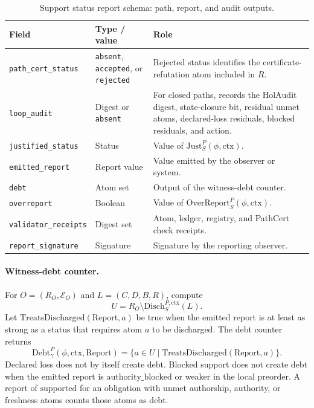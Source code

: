 \documentclass[11pt,twoside]{article}
\newcommand{\OGSchemaTableFont}{\footnotesize}
\newcommand{\OGTableHeaderRow}{\rowcolor{tableheaderbg}}
\newcommand{\TableHeaderRow}{\OGTableHeaderRow}
\newenvironment{OGTable}[2][ht]{%
  \begin{table}[#1]
  \centering
  #2
  \renewcommand{\arraystretch}{1.08}%
  \rowcolors{2}{tablerowbg}{white}%
}{%
  \rowcolors{2}{}{}%
  \end{table}%
}
\theoremstyle{definition}
\newcommand{\Debt}{\mathrm{Debt}}
\newcommand{\Disch}{\mathrm{Disch}}
\newcommand{\Just}{\mathrm{Just}}
\newcommand{\Report}{\mathrm{Report}}
\newcommand{\OverReport}{\mathrm{OverReport}}
\newcommand{\ctx}{\mathrm{ctx}}
\newcommand{\supported}{\mathrm{supported}}
\newcommand{\authorityblocked}{\mathrm{authority\_blocked}}
\begin{document}
\begin{OGTable}{\OGSchemaTableFont}
\begin{tabularx}{\textwidth}{>{\raggedright\arraybackslash}p{}>{\raggedright\arraybackslash}p{}>{\raggedright\arraybackslash}X}
\toprule
\TableHeaderRow \textbf{Field} & \textbf{Type / value} & \textbf{Role} \\
\midrule
\texttt{path\_cert\_status} & \texttt{absent}, \texttt{accepted}, or \texttt{rejected} & Rejected status identifies the certificate-refutation atom included in $R$. \\
\texttt{loop\_audit} & Digest or \texttt{absent} & For closed paths, records the $\mathrm{HolAudit}$ digest, state-closure bit, residual unmet atoms, declared-loss residuals, blocked residuals, and action. \\
\texttt{justified\_status} & Status & Value of $\Just_S^P(\phi,\ctx)$. \\
\texttt{emitted\_report} & Report value & Value emitted by the observer or system. \\
\texttt{debt} & Atom set & Output of the witness-debt counter. \\
\texttt{overreport} & Boolean & Value of $\OverReport_S^P(\phi,\ctx)$. \\
\texttt{validator\_receipts} & Digest set & Atom, ledger, registry, and PathCert check receipts. \\
\texttt{report\_signature} & Signature & Signature by the reporting observer. \\
\bottomrule
\end{tabularx}
\caption{Support status report schema: path, report, and audit outputs.}
\label{tab:support-status-report-output-schema}
\end{OGTable}
\FloatBarrier

\paragraph{Witness-debt counter.}
For $O=(R_O,\mathcal E_O)$ and $L=(C,D,B,R)$, compute
\[
  U=R_O\setminus \Disch_S^{P,\ctx}(L).
\]
Let $\mathrm{TreatsDischarged}(\Report,a)$ be true when the emitted report is
at least as strong as a status that requires atom $a$ to be discharged. The debt
counter returns
\[
  \Debt_\gamma^P(\phi,\ctx,\Report)
  =
  \{a\in U\mid \mathrm{TreatsDischarged}(\Report,a)\}.
\]
Declared loss does not by itself create debt. Blocked support does not create
debt when the emitted report is $\authorityblocked$ or weaker in the local
preorder. A report of $\supported$ for an obligation with unmet authorship,
authority, or freshness atoms counts those atoms as debt.
\end{document}
